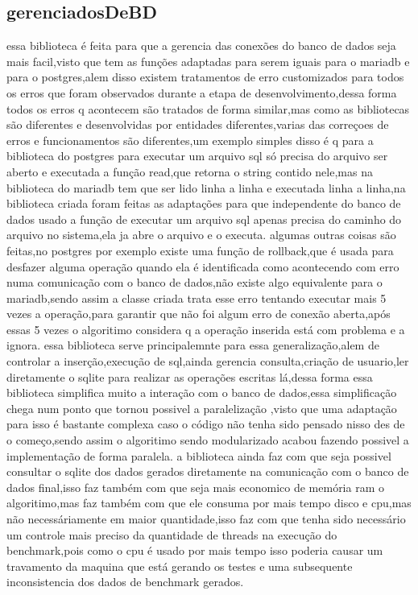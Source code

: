 \documentclass[
	12pt,				%
	openright,			%
	oneside,			%
	a4paper,			%
	english,			%
	french,				%
	spanish,			%
	brazil,				%
	]{abntex2}
\begin{document}
\subsection{gerenciadosDeBD}
\label{subsec:gerenciadosDeBD}
essa biblioteca é feita para que a gerencia das conexões do banco de dados seja mais facil,visto que tem as funções adaptadas para serem iguais para o mariadb e para o postgres,alem disso existem tratamentos de erro customizados para todos os erros que foram observados durante a etapa de desenvolvimento,dessa forma todos os erros q acontecem são tratados de forma similar,mas como as bibliotecas são diferentes e desenvolvidas por entidades diferentes,varias das correçoes de erros e funcionamentos são diferentes,um exemplo simples disso é q para a biblioteca do postgres para executar um arquivo sql só precisa do arquivo ser aberto e executada a função read,que retorna o string contido nele,mas na biblioteca do mariadb tem que ser lido linha a linha e executada linha a linha,na biblioteca criada foram feitas as adaptações para que independente do banco de dados usado a função de executar um arquivo sql apenas precisa do caminho do arquivo no sistema,ela ja abre o arquivo e o executa.
algumas outras coisas são feitas,no postgres por exemplo existe uma função de rollback,que é usada para desfazer alguma operação quando ela é identificada como acontecendo com erro numa comunicação com o banco de dados,não existe algo equivalente para o mariadb,sendo assim a classe criada trata esse erro tentando executar mais 5 vezes a operação,para garantir que não foi algum erro de conexão aberta,após essas 5 vezes o algoritimo considera q a operação inserida está com problema e a ignora.
essa biblioteca serve principalemnte para essa generalização,alem de controlar a inserção,execução de sql,ainda gerencia consulta,criação de usuario,ler diretamente o sqlite para realizar as operações escritas lá,dessa forma essa biblioteca simplifica muito a interação com o banco de dados,essa simplificação chega num ponto que tornou possivel a paralelização ,visto que uma adaptação para isso é bastante complexa caso o código não tenha sido pensado nisso des de o começo,sendo assim o algoritimo sendo modularizado acabou fazendo possivel a implementação de forma paralela.
a biblioteca ainda faz com que seja possivel consultar o sqlite dos dados gerados diretamente na comunicação com o banco de dados final,isso faz também com que seja mais economico de memória ram o algoritimo,mas faz também com que ele consuma por mais tempo disco e cpu,mas não necessáriamente em maior quantidade,isso faz com que tenha sido necessário um controle mais preciso da quantidade de threads na execução do benchmark,pois como o cpu é usado por mais tempo isso poderia causar um travamento da maquina que está gerando os testes e uma subsequente inconsistencia dos dados de benchmark gerados.
\end{document}
